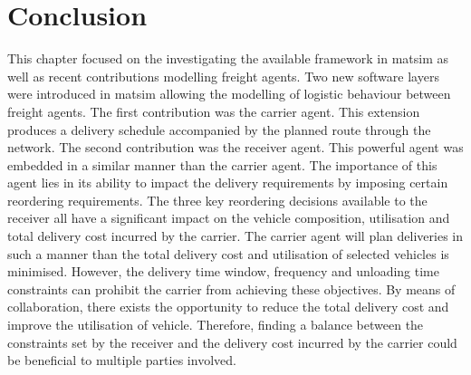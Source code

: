 \section{Conclusion}
This chapter focused on the investigating the available framework in \acrshort{matsim} as well as recent contributions modelling freight agents. Two new software layers were introduced in \acrshort{matsim} allowing the modelling of logistic behaviour between freight agents. The first contribution was the carrier agent. This extension produces a delivery schedule accompanied by the planned route through the network.  The second contribution was the receiver agent. This powerful agent was embedded in a similar manner than the carrier agent. The importance of this agent lies in its ability to impact the delivery requirements by imposing certain reordering requirements. The three key reordering decisions available to the receiver all have a significant impact on the vehicle composition, utilisation and total delivery cost incurred by the carrier. The carrier agent will plan deliveries in such a manner than the total delivery cost and utilisation of selected vehicles is minimised. However, the delivery time window, frequency and unloading time constraints can prohibit the carrier from achieving these objectives. By means of collaboration, there exists the opportunity to reduce the total delivery cost and improve the utilisation of vehicle. Therefore, finding a balance between the constraints set by the receiver and the delivery cost incurred by the carrier could be beneficial to multiple parties involved.

